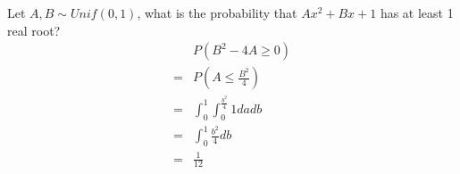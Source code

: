 Let $A , B \sim Unif(0, 1)$, what is the probability that  $Ax^2 + Bx + 1$ has at least 1 real root? \\

 \begin{align*}
    &P(B^2 - 4A \geq 0) \\
    =& P \left(A \leq \frac{B^2}{4} \right) \\
    =& \int_{0}^{1}  \int_{0}^{ \frac{b^2}{4}}    1 da db \\
    =& \int_{0}^{1}  \frac{b^2}{4}  db \\
    =& \frac{1}{12}
\end{align*}




